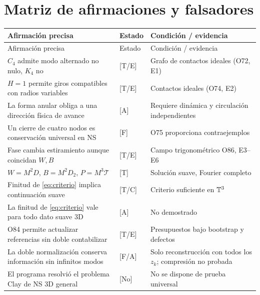 \documentclass[11pt,a4paper]{article}
\theoremstyle{definition}\newtheorem{defi}[teo]{Definición}
\newcommand{\stat}[1]{\textcolor{blue!50!black}{\textsf{[#1]}}}
\begin{document}
\section{Matriz de afirmaciones y falsadores}
\small
\begin{longtable}{p{}p{}p{}}
\toprule Afirmación precisa & Estado & Condición / evidencia\\\midrule\endfirsthead
\toprule Afirmación precisa & Estado & Condición / evidencia\\\midrule\endhead
$C_4$ admite modo alternado no nulo, $K_4$ no & \stat{T/E} & Grafo de contactos ideales (O72, E1)\\
$H=1$ permite giros compatibles con radios variables & \stat{T/E} & Contactos ideales (O74, E2)\\
La forma anular obliga a una dirección física de avance & \stat{A} & Requiere dinámica y circulación independientes\\
Un cierre de cuatro nodos es conservación universal en NS & \stat{F} & O75 proporciona contraejemplos\\
Fase cambia estiramiento aunque coincidan $W,B$ & \stat{T/E} & Campo trigonométrico O86, E3--E6\\
$W=M^2D$, $B=M^2D_2$, $P=M^3\mathcal T$ & \stat{T} & Solución suave, Fourier completo\\
Finitud de \eqref{eq:criterio} implica continuación suave & \stat{T/C} & Criterio suficiente en $\mathbb{T}^3$\\
La finitud de \eqref{eq:criterio} vale para todo dato suave 3D & \stat{A} & No demostrado\\
O84 permite actualizar referencias sin doble contabilizar & \stat{T/E} & Presupuestos bajo bootstrap y defectos\\
La doble normalización conserva información sin infinitos modos & \stat{F/A} & Solo reconstrucción con todos los $z_k$; compresión no probada\\
El programa resolvió el problema Clay de NS 3D general & \stat{No} & No se dispone de prueba universal\\
\bottomrule
\end{longtable}\normalsize
\end{document}
